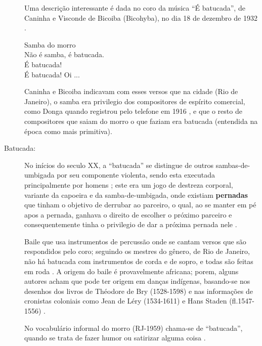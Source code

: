 \begin{description}
Uma descrição interessante é dada no coro da música ``É batucada'', 
de Caninha e Visconde de Bicoiba (Bicohyba), no dia 18 de dezembro de 1932 \cite[pp. 12]{refebatucadajornal}.
\begin{citando}
Samba do morro\\
Não é samba, é batucada.\\
É batucada!\\
É batucada! Oi ...\\
\end{citando}
Caninha e Bicoiba indicavam com esses versos que na cidade (Rio de Janeiro),
o samba era privilegio dos compositores de espírito comercial, 
como Donga quando registrou pelo telefone em 1916 \cite[Cad. B pp. 4]{jornalsambaderoda5},
e que o resto de compositores que saiam do morro o que faziam era batucada 
(entendida na época como mais primitiva).


\item [Batucada:]
\label{ref:batucadadanca}
No inícios do seculo XX,
a ``batucada'' se distingue de outros sambas-de-umbigada por seu componente violenta, 
sendo esta executada principalmente por homens \cite[pp. 8]{reffolclorebatucadajornal} \cite[pp. 103]{sandroni2001feitico};
este era um jogo de destreza corporal, variante da capoeira e da samba-de-umbigada,
onde existiam \textbf{pernadas} que tinham o objetivo de derrubar ao parceiro, o qual, ao se manter em pé apos a pernada,
ganhava o direito de escolher o próximo parceiro
 e consequentemente tinha o privilegio de dar a próxima pernada nele \cite[pp. 103]{sandroni2001feitico}.

Baile que usa instrumentos de percussão onde se cantam versos que são respondidos pelo coro;
seguindo os mestres do gênero, de Rio de Janeiro, 
não há batucada com instrumentos de corda e de sopro, 
e  todas são feitas em roda \cite[pp. 89]{marcondes1977enciclopedia}.
A origem do baile é provavelmente africana; porem, alguns autores acham que pode ter origem em  danças indígenas,
basando-se nos desenhos dos livros de Théodore de Bry (1528-1598) e
nas informações de cronistas coloniais como Jean de Léry (1534-1611) e
Hans Staden (fl.1547-1556) \cite[pp. 89]{marcondes1977enciclopedia}.

No vocabulário informal do morro (RJ-1959) chama-se de ``batucada'',
quando se trata de fazer humor ou satirizar alguma coisa \cite[pp. 32]{jornalsambaderoda2}.
\end{description}



